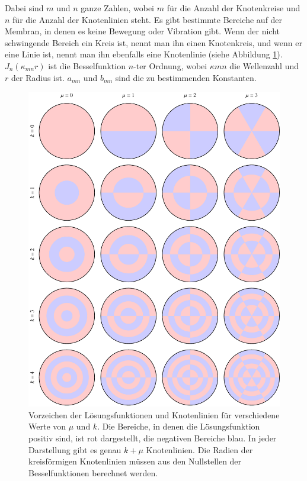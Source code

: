 Dabei sind $m$ und $n$ ganze Zahlen, wobei $m$ für die Anzahl der Knotenkreise und $n$
für die Anzahl der Knotenlinien steht. Es gibt bestimmte Bereiche auf der Membran, in denen es keine Bewegung oder Vibration gibt. Wenn der nicht schwingende Bereich ein Kreis ist, nennt man ihn einen Knotenkreis, und wenn er eine Linie ist, nennt man ihn ebenfalls eine Knotenlinie (siehe Abbildung \ref{buch:pde:kreis:fig:pauke}). $J_n(\kappa_{mn}r)$ ist die Besselfunktion $n$-ter Ordnung, wobei $\kappa mn$ die Wellenzahl und $r$ der Radius ist. $a_{mn}$ und $b_{mn}$ sind die zu bestimmenden Konstanten.

\begin{figure}
	\centering
	\includegraphics[width=\textwidth]{chapters/090-pde/bessel/pauke.pdf}
	\caption{Vorzeichen der Lösungsfunktionen und Knotenlinien
		für verschiedene Werte von $\mu$ und $k$.
		Die Bereiche, in denen die Lösungsfunktion positiv sind, ist 
		rot dargestellt, die negativen Bereiche blau.
		In jeder Darstellung gibt es genau $k+\mu$ Knotenlinien.
		Die Radien der kreisförmigen Knotenlinien müssen aus den Nullstellen
		der Besselfunktionen berechnet werden.
		\label{buch:pde:kreis:fig:pauke}}
\end{figure}

